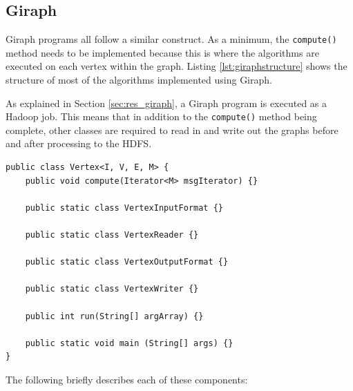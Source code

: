 \subsection{Giraph}
Giraph programs all follow a similar construct. As a minimum, the \verb/compute()/ method needs to be implemented because this is where the algorithms are executed on each vertex within the graph. Listing \ref{lst:giraphstructure} shows the structure of most of the algorithms implemented using Giraph.

As explained in Section \ref{sec:res_giraph}, a Giraph program is executed as a Hadoop job. This means that in addition to the \verb/compute()/ method being complete, other classes are required to read in and write out the graphs before and after processing to the HDFS.

\begin{lstlisting}[float]
public class Vertex<I, V, E, M> {
	public void compute(Iterator<M> msgIterator) {}
	
	public static class VertexInputFormat {}
	
	public static class VertexReader {}
	
	public static class VertexOutputFormat {}
	
	public static class VertexWriter {}
	
	public int run(String[] argArray) {}
	
	public static void main (String[] args) {}
}						
\end{lstlisting}

The following briefly describes each of these components:

